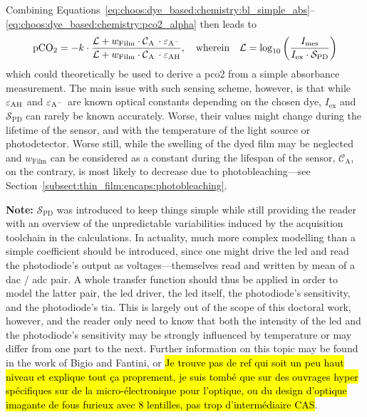 Combining Equations~\ref{eq:choos:dye_based:chemistry:bl_simple_abs}--\ref{eq:choos:dye_based:chemistry:pco2_alpha} then leads to
\begin{equation}
	\ce{pCO_2} = - k \cdot \frac{\mathcal{L} + w_\text{Film} \cdot \ce{ \mathcal{C}_A \cdot \varepsilon_{A^-}} }{ \mathcal{L} + w_\text{Film} \cdot \ce{ \mathcal{C}_A \cdot \varepsilon_{AH}} }, \quad \text{wherein} \quad \mathcal{L} = \log_{10} \left( \frac{I_\text{mes}}{I_\text{ex}\cdot \mathcal{S}_\text{PD}} \right)
\end{equation}
which could theoretically be used to derive a \gls{pco2} from a simple absorbance measurement. The main issue with such sensing scheme, however, is that while $\ce{\varepsilon_{AH}}$ and $\ce{\varepsilon_{A^-}}$ are known optical constants depending on the chosen dye, $I_\text{ex}$ and $\mathcal{S}_\text{PD}$ can rarely be known accurately. Worse, their values might change during the lifetime of the sensor, and with the temperature of the light source\cite{reynolds1991} or photodetector\cite{ahmad1979}. Worse still, while the swelling of the dyed film may be neglected and $w_\text{Film}$ can be considered as a constant during the lifespan of the sensor, $\mathcal{C}_\text{A}$, on the contrary, is most likely to decrease due to photobleaching---see Section~\ref{subsect:thin_film:encaps:photobleaching}.

\textbf{Note:} $\mathcal{S}_\text{PD}$ was introduced to keep things simple while still providing the reader with an overview of the unpredictable variabilities induced by the acquisition toolchain in the calculations. In actuality, much more complex modelling than a simple coefficient should be introduced, since one might drive the \gls{led} and read the photodiode's output as voltages---themselves read and written by mean of a \gls{dac} / \gls{adc} pair. A whole transfer function should thus be applied in order to model the latter pair, the \gls{led} driver, the \gls{led} itself, the photodiode's sensitivity, and the photodiode's \gls{tia}. This is largely out of the scope of this doctoral work, however, and the reader only need to know that both the intensity of the \gls{led} and the photodiode's sensitivity may be strongly influenced by temperature or may differ from one part to the next. Further information on this topic may be found in the work of Bigio and Fantini\cite[Chap.~13]{bigio2016}, or \hl{Je trouve pas de ref qui soit un peu haut niveau et explique tout ça proprement, je suis tombé que sur des ouvrages hyper spécifiques sur de la micro-électronique pour l'optique, ou du design d'optique imagante de fous furieux avec 8 lentilles, pas trop d'intermédiaire CAS}.

